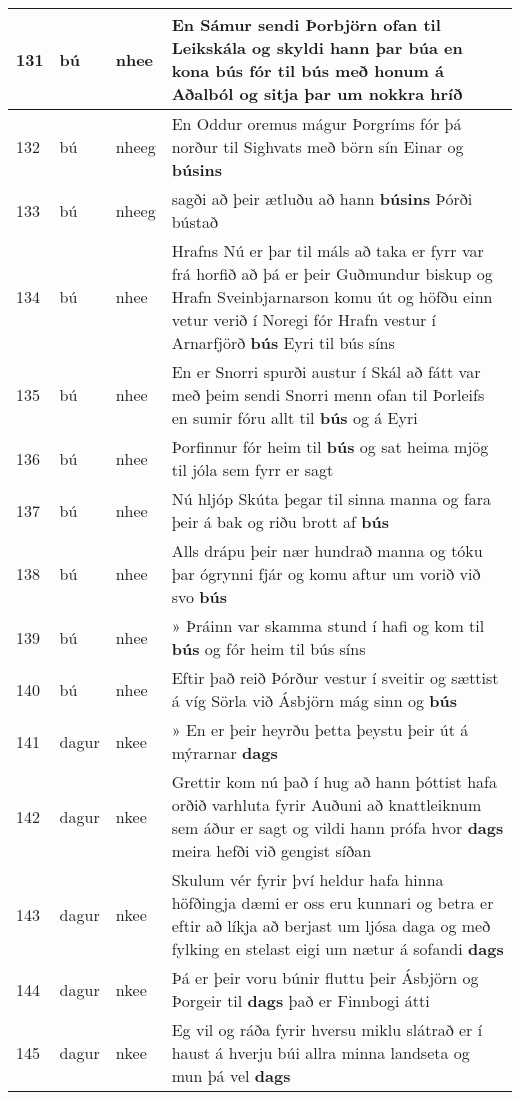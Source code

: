 \documentclass{article}
\begin{document}
\begin{longtable}{p{1cm}|p{1cm}|p{1cm}|p{13cm}}
\hline
131&bú&nhee&En Sámur sendi Þorbjörn ofan til Leikskála og skyldi hann þar búa en kona \textbf{bús} fór til bús með honum á Aðalból og sitja þar um nokkra hríð\\
\hline
132&bú&nheeg&En Oddur oremus mágur Þorgríms fór þá norður til Sighvats með börn sín Einar og \textbf{búsins} \\
\hline
133&bú&nheeg&sagði að þeir ætluðu að hann \textbf{búsins} Þórði bústað\\
\hline
134&bú&nhee&Hrafns Nú er þar til máls að taka er fyrr var frá horfið að þá er þeir Guðmundur biskup og Hrafn Sveinbjarnarson komu út og höfðu einn vetur verið í Noregi fór Hrafn vestur í Arnarfjörð \textbf{bús} Eyri til bús síns\\
\hline
135&bú&nhee&En er Snorri spurði austur í Skál að fátt var með þeim sendi Snorri menn ofan til Þorleifs en sumir fóru allt til \textbf{bús} og á Eyri\\
\hline
136&bú&nhee&Þorfinnur fór heim til \textbf{bús} og sat heima mjög til jóla sem fyrr er sagt\\
\hline
137&bú&nhee&Nú hljóp Skúta þegar til sinna manna og fara þeir á bak og riðu brott af \textbf{bús} \\
\hline
138&bú&nhee&Alls drápu þeir nær hundrað manna og tóku þar ógrynni fjár og komu aftur um vorið við svo \textbf{bús} \\
\hline
139&bú&nhee&» Þráinn var skamma stund í hafi og kom til \textbf{bús} og fór heim til bús síns\\
\hline
140&bú&nhee&Eftir það reið Þórður vestur í sveitir og sættist á víg Sörla við Ásbjörn mág sinn og \textbf{bús} \\
\hline
141&dagur&nkee&» En er þeir heyrðu þetta þeystu þeir út á mýrarnar \textbf{dags} \\
\hline
142&dagur&nkee&Grettir kom nú það í hug að hann þóttist hafa orðið varhluta fyrir Auðuni að knattleiknum sem áður er sagt og vildi hann prófa hvor \textbf{dags} meira hefði við gengist síðan\\
\hline
143&dagur&nkee&Skulum vér fyrir því heldur hafa hinna höfðingja dæmi er oss eru kunnari og betra er eftir að líkja að berjast um ljósa daga og með fylking en stelast eigi um nætur á sofandi \textbf{dags} \\
\hline
144&dagur&nkee&Þá er þeir voru búnir fluttu þeir Ásbjörn og Þorgeir til \textbf{dags} það er Finnbogi átti\\
\hline
145&dagur&nkee&Eg vil og ráða fyrir hversu miklu slátrað er í haust á hverju búi allra minna landseta og mun þá vel \textbf{dags} \\

\end{longtable}
\end{document}
